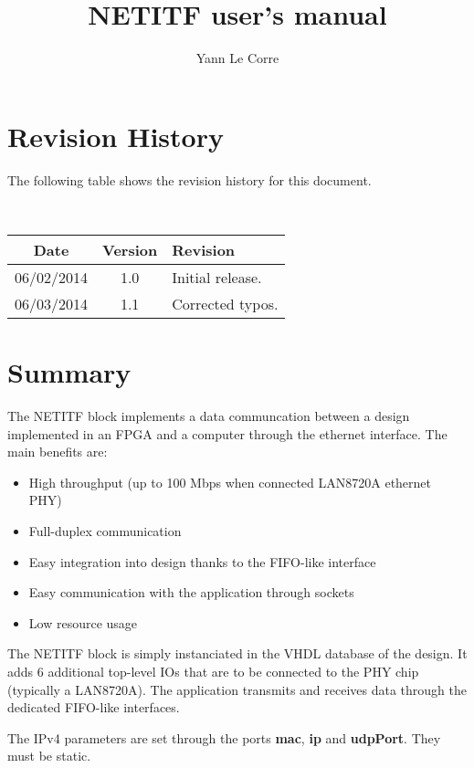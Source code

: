 \documentclass[a4paper]{hitec}
\author{Yann Le Corre}
\title{NETITF user's manual}
\newcommand{\signal}[1]{\textbf{#1}}
\begin{document}
\maketitle



\section{Revision History}
The following table shows the revision history for this document.

\ \\
\begin{tabularx}{\linewidth}{ccX}
	\hline
	Date & Version & Revision \\
	\hline
	06/02/2014 & 1.0 & Initial release. \\
	06/03/2014 & 1.1 & Corrected typos. \\
	\hline
\end{tabularx}



\section{Summary}

The NETITF block implements a data communcation between a design implemented in an FPGA and a computer through the ethernet interface. The main benefits are:

\begin{itemize}
	\item High throughput (up to 100 Mbps when connected LAN8720A ethernet PHY)
	\item Full-duplex communication
	\item Easy integration into design thanks to the FIFO-like interface
	\item Easy communication with the application through sockets
	\item Low resource usage
\end{itemize}

The NETITF block is simply instanciated in the VHDL database of the design. It adds 6 additional top-level IOs that are to be connected to the PHY chip (typically a LAN8720A). The application transmits and receives data through the dedicated FIFO-like interfaces.

The IPv4 parameters are set through the ports \signal{mac}, \signal{ip} and \signal{udpPort}. They must be static.
\end{document}
